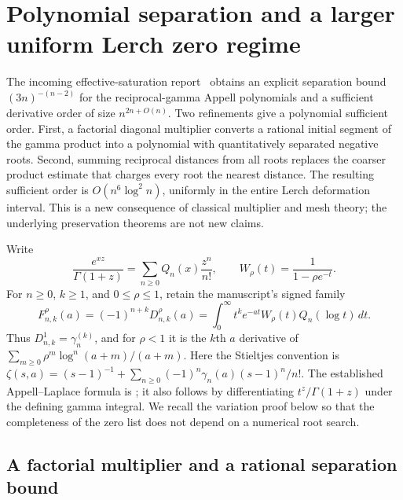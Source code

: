 
\section{Polynomial separation and a larger uniform Lerch zero regime}
\label{polylerch:sec:main}

The incoming effective-saturation report~\cite{incoming-uniform} obtains an explicit separation
bound $(3n)^{-(n-2)}$ for the reciprocal-gamma Appell polynomials and
a sufficient derivative order of size $n^{2n+O(n)}$.  Two refinements
give a polynomial sufficient order. First, a factorial diagonal
multiplier converts a rational initial segment of the gamma product
into a polynomial with quantitatively separated negative roots.
Second, summing reciprocal distances from all roots replaces the
coarser product estimate that charges every root the nearest distance.
The resulting sufficient order is $O(n^6\log^2 n)$, uniformly in the
entire Lerch deformation interval. This is a new consequence of
classical multiplier and mesh theory; the underlying preservation
theorems are not new claims.

Write
\[
 \frac{e^{xz}}{\Gamma(1+z)}
   =\sum_{n\ge0}Q_n(x)\frac{z^n}{n!},\qquad
 W_\rho(t)=\frac1{1-\rho e^{-t}}.
\]
For $n\ge0$, $k\ge1$, and $0\le\rho\le1$, retain the manuscript's
signed family
\begin{equation}\label{polylerch:eq:F}
 F_{n,k}^{\rho}(a)=(-1)^{n+k}D_{n,k}^{\rho}(a)
 =\int_0^\infty t^k e^{-at}W_\rho(t)Q_n(\log t)\,dt.
\end{equation}
Thus $D_{n,k}^{1}=\gamma_n^{(k)}$, and for $\rho<1$ it is the
$k$th $a$ derivative of
$\sum_{m\ge0}\rho^m\log^n(a+m)/(a+m)$.
Here the Stieltjes convention is
$\zeta(s,a)=(s-1)^{-1}+\sum_{n\ge0}(-1)^n\gamma_n(a)(s-1)^n/n!$.
The established Appell--Laplace formula is
\cite[\texttt{zeros:thm:laplace}]{baseline}; it also follows by differentiating
$t^z/\Gamma(1+z)$ under the defining gamma integral. We recall the
variation proof below so that the completeness of the zero list does
not depend on a numerical root search.

\subsection{A factorial multiplier and a rational separation bound}

